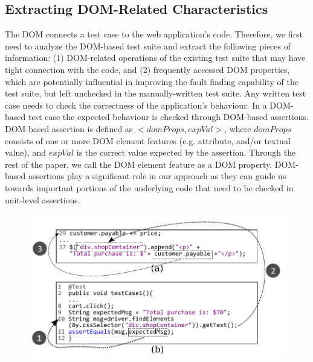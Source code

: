 \subsection{Extracting DOM-Related Characteristics} \label{Sec:extractDomRelatedInfo}
The DOM connects a test case to the web application's code. Therefore, we first need to analyze the DOM-based test suite and extract the following pieces of information: (1) DOM-related operations of the existing test suite that may have tight connection with the \javascript code, and (2) frequently accessed DOM properties, which are potentially influential in improving the fault finding capability of the test suite, but left unchecked in the manually-written test suite.
Any written test case needs to check the correctness of the application's behaviour. In a DOM-based test case the expected behaviour is checked through DOM-based assertions.
DOM-based assertion is defined as $<domProps,expVal>$, where $domProps$ consists of one or more DOM element features (e.g. attribute, and/or textual value), and $expVal$ is the correct value expected by the assertion. Through the rest of the paper, we call the DOM element feature as a DOM property. 
DOM-based assertions play a significant role in our approach as they can guide us towards important portions of the underlying \javascript code that need to be checked in unit-level assertions.
\begin{figure}[!t]
  \centering
  \includegraphics[width=1\hsize]{fig/intraDOMDep}
   \vspace{-0.3in} 
  \label{Fig:assertionToCode}
  \vspace{-0.2in} 
\end{figure}
